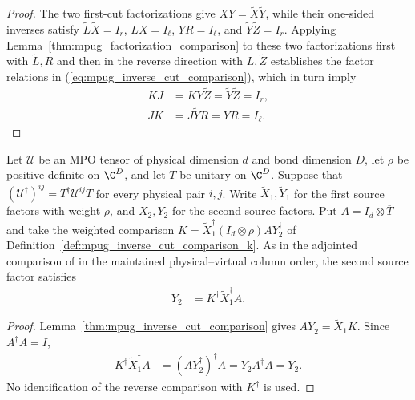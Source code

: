 \begin{proof}\leanok
    The two first-cut factorizations give $XY=\widetilde X\widetilde Y$, while
    their one-sided inverses satisfy $\widetilde L\widetilde X=I_r$,
    $LX=I_\ell$, $YR=I_\ell$, and $\widetilde Y\widetilde Z=I_r$. Applying
    Lemma~\ref{thm:mpug_factorization_comparison} to these two factorizations
    first with $\widetilde L,R$ and then in the reverse direction with
    $L,\widetilde Z$ establishes the factor relations in
    (\ref{eq:mpug_inverse_cut_comparison}), which in turn imply
    \begin{align}
        KJ & =KY\widetilde Z=\widetilde Y\widetilde Z=I_r, \\
        JK & =J\widetilde YR=YR=I_\ell.
    \end{align}
\end{proof}
\begin{lemma}
    \label{thm:mpug_inverse_cut_adjoint_comparison}
    \leanok
    Let $\mathcal U$ be an MPO tensor of physical dimension $d$ and bond
    dimension $D$, let $\rho$ be positive definite on $\C^D$, and let
    $T$ be unitary on $\C^D$. Suppose that
    $(\mathcal U^\dagger)^{ij}=T^\dagger\mathcal U^{ij}T$ for every
    physical pair $i,j$. Write $\widetilde X_1,\widetilde Y_1$ for the
    first source factors with weight $\rho$, and $X_2,Y_2$ for the
    second source factors. Put $A=I_d\otimes\overline T$ and take the
    weighted comparison
    $K=\widetilde X_1^\dagger(I_d\otimes\rho)AY_2^\dagger$ of
    Definition~\ref{def:mpug_inverse_cut_comparison_k}. As in the adjointed
    comparison of \cite[lines~5440--5443]{FrancoRubio2025MPUGauging} in the
    maintained physical--virtual column order, the second source factor
    satisfies
    \begin{align}
        Y_2 & =K^\dagger\widetilde X_1^\dagger A.
    \end{align}
\end{lemma}
\begin{proof}\leanok
    Lemma~\ref{thm:mpug_inverse_cut_comparison} gives
    $AY_2^\dagger=\widetilde X_1K$. Since $A^\dagger A=I$,
    \begin{align}
        K^\dagger\widetilde X_1^\dagger A
         & =(AY_2^\dagger)^\dagger A
        =Y_2A^\dagger A=Y_2.
    \end{align}
    No identification of the reverse comparison with $K^\dagger$ is used.
\end{proof}

